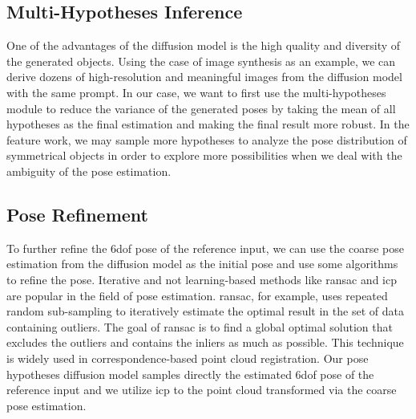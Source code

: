 \documentclass[12pt,DIV14,BCOR12mm,a4paper,footinclude=false,headinclude,parskip=half-,twoside,openright,cleardoublepage=empty,toc=index,bibliography=totoc,listof=totoc]{scrreprt}
\numberwithin{equation}{chapter}
\begin{document}
\subsection{Multi-Hypotheses Inference}
One of the advantages of the diffusion model is the high quality and diversity of the generated objects. Using the case of image synthesis as an example, we can derive dozens of high-resolution and meaningful images from the diffusion model with the same prompt. In our case, we want to first use the multi-hypotheses module to reduce the variance of the generated poses by taking the mean of all hypotheses as the final estimation and making the final result more robust. In the feature work, we may sample more hypotheses to analyze the pose distribution of symmetrical objects in order to explore more possibilities when we deal with the ambiguity of the pose estimation.

\subsection{Pose Refinement}
To further refine the \gls{6dof} pose of the reference input, we can use the coarse pose estimation from the diffusion model as the initial pose and use some algorithms to refine the pose. Iterative and not learning-based methods like \gls{ransac} \cite{10.1145/358669.358692} and \gls{icp} \cite{121791} are popular in the field of pose estimation. \gls{ransac}, for example, uses repeated random sub-sampling to iteratively estimate the optimal result in the set of data containing outliers. The goal of \gls{ransac} is to find a global optimal solution that excludes the outliers and contains the inliers as much as possible. This technique is widely used in correspondence-based point cloud registration. Our pose hypotheses diffusion model samples directly the estimated \gls{6dof} pose of the reference input and we utilize \gls{icp} to the point cloud transformed via the coarse pose estimation. 
\end{document}
